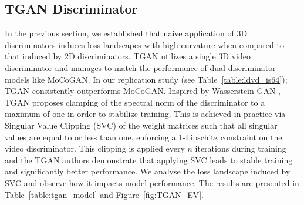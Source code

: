 \documentclass[a4paper,fleqn]{cas-sc}
\begin{document}
\subsection{TGAN Discriminator}
In the previous section, we established that naive application of 3D discriminators induces loss landscapes with high curvature when compared to that induced by 2D discriminators. TGAN \cite{SaitoMS17temporal} utilizes a single 3D video discriminator and manages to match the performance of dual discriminator models like MoCoGAN. In our replication study (see Table~\ref{table:ldvd_is64}); TGAN consistently outperforms MoCoGAN. Inspired by Wasserstein GAN \cite{ArjovskyCB17wasserstein}, TGAN proposes clamping of the spectral norm of the discriminator to a maximum of one in order to stabilize training. This is achieved in practice via Singular Value Clipping (SVC) of the weight matrices such that all singular values are equal to or less than one, enforcing a 1-Lipschitz constraint on the video discriminator. This clipping is applied every $n$ iterations during training and the TGAN authors demonstrate that applying SVC leads to stable training and significantly better performance. We analyse the loss landscape induced by SVC and observe how it impacts model performance. The results are presented in Table~\ref{table:tgan_model} and Figure~\ref{fig:TGAN_EV}.
\end{document}

